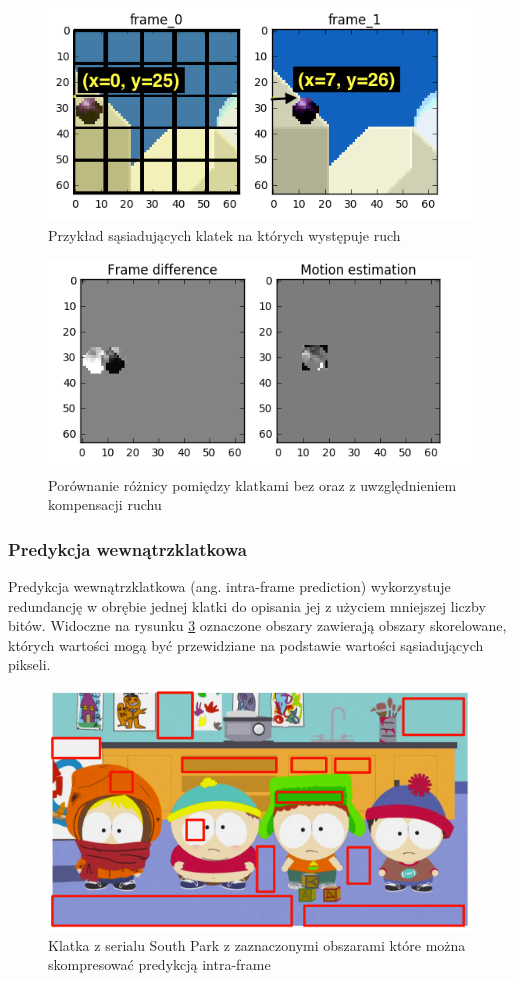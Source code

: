 \begin{figure}[H]
    \centering
    \includegraphics[width=.5\textwidth]{img/rozdzial2/original_frames_motion_estimation}
    \caption{Przykład sąsiadujących klatek na których występuje ruch}
    \label{fig:motion_compensation}
\end{figure}

\begin{figure}[H]
    \centering
    \includegraphics[width=.5\textwidth]{img/rozdzial2/difference_frames}
    \caption{Porównanie różnicy pomiędzy klatkami bez oraz z uwzględnieniem kompensacji ruchu}
    \label{fig:motion_compensation_residual}
\end{figure}

\subsubsection{Predykcja wewnątrzklatkowa}

Predykcja wewnątrzklatkowa (ang. intra-frame prediction) wykorzystuje redundancję w obrębie jednej
klatki do opisania jej z użyciem mniejszej liczby bitów. Widoczne na rysunku
\ref{fig:intra_frame_compression} oznaczone obszary zawierają obszary skorelowane, których wartości
mogą być przewidziane na podstawie wartości sąsiadujących pikseli.

\begin{figure}[H]
    \centering
    \includegraphics[width=.5\textwidth]{img/rozdzial2/repetitions_in_space}
    \caption{Klatka z serialu South Park z zaznaczonymi obszarami które można skompresować predykcją intra-frame}
    \label{fig:intra_frame_compression}
\end{figure}

